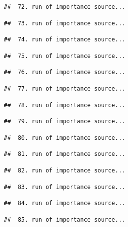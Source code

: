 \documentclass[
]{article}
\begin{document}
\begin{verbatim}
##  72. run of importance source...
\end{verbatim}

\begin{verbatim}
##  73. run of importance source...
\end{verbatim}

\begin{verbatim}
##  74. run of importance source...
\end{verbatim}

\begin{verbatim}
##  75. run of importance source...
\end{verbatim}

\begin{verbatim}
##  76. run of importance source...
\end{verbatim}

\begin{verbatim}
##  77. run of importance source...
\end{verbatim}

\begin{verbatim}
##  78. run of importance source...
\end{verbatim}

\begin{verbatim}
##  79. run of importance source...
\end{verbatim}

\begin{verbatim}
##  80. run of importance source...
\end{verbatim}

\begin{verbatim}
##  81. run of importance source...
\end{verbatim}

\begin{verbatim}
##  82. run of importance source...
\end{verbatim}

\begin{verbatim}
##  83. run of importance source...
\end{verbatim}

\begin{verbatim}
##  84. run of importance source...
\end{verbatim}

\begin{verbatim}
##  85. run of importance source...
\end{verbatim}
\end{document}
